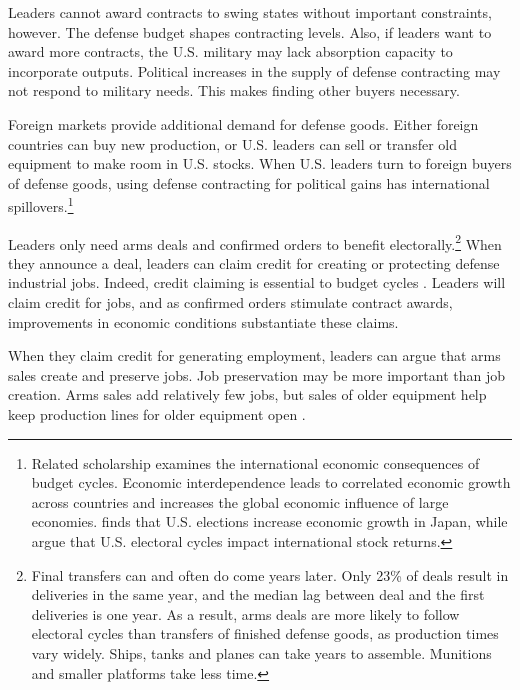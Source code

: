 \documentclass[12pt]{article}
\begin{document}
Leaders cannot award contracts to swing states without important constraints, however. 
The defense budget shapes contracting levels. 
Also, if leaders want to award more contracts, the U.S. military may lack absorption capacity to incorporate outputs.
Political increases in the supply of defense contracting may not respond to military needs.
This makes finding other buyers necessary.


Foreign markets provide additional demand for defense goods.
Either foreign countries can buy new production, or U.S. leaders can sell or transfer old equipment to make room in U.S. stocks. 
When U.S. leaders turn to foreign buyers of defense goods, using defense contracting for political gains has international spillovers.\footnote{%
Related scholarship examines the international economic consequences of budget cycles.
Economic interdependence leads to correlated economic growth across countries \citep{Kayser2006} and increases the global economic influence of large economies. 
\citet{Ito1991} finds that U.S. elections increase economic growth in Japan, while \citet{FoersterSchmitz1997} argue that U.S. electoral cycles impact international stock returns.
}


Leaders only need arms deals and confirmed orders to benefit electorally.\footnote{Final transfers can and often do come years later. 
Only 23\% of deals result in deliveries in the same year, and the median lag between deal and the first deliveries is one year. 
As a result, arms deals are more likely to follow electoral cycles than transfers of finished defense goods, as production times vary widely. 
Ships, tanks and planes can take years to assemble.
Munitions and smaller platforms take less time.}
When they announce a deal, leaders can claim credit for creating or protecting defense industrial jobs. 
Indeed, credit claiming is essential to budget cycles \citep{Bueno2021}. 
Leaders will claim credit for jobs, and as confirmed orders stimulate contract awards, improvements in economic conditions substantiate these claims. 


When they claim credit for generating employment, leaders can argue that arms sales create and preserve jobs.
Job preservation may be more important than job creation. 
Arms sales add relatively few jobs, but sales of older equipment help keep production lines for older equipment open \citep{Caverley2018}. 
\end{document}
